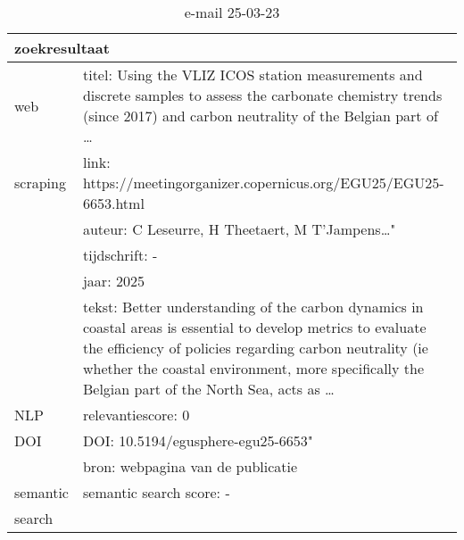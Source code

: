 \begin{table}[h!]
    \caption{e-mail 25-03-23}
    \centering
    \begin{tabularx}{\textwidth}{|p{4cm}|X|} 
        \hline
        \multicolumn{2}{|X|}{\textbf{zoekresultaat}} \\
        \hline
        web &titel: Using the VLIZ ICOS station measurements and discrete samples to assess the carbonate chemistry trends (since 2017) and carbon neutrality of the Belgian part of …\\
        scraping&link: https://meetingorganizer.copernicus.org/EGU25/EGU25-6653.html\\
        &auteur: C Leseurre, H Theetaert, M T'Jampens…"\\
        &tijdschrift: -\\
        &jaar: 2025\\
        &tekst: Better understanding of the carbon dynamics in coastal areas is essential to develop metrics to evaluate the efficiency of policies regarding carbon neutrality (ie whether the coastal environment, more specifically the Belgian part of the North Sea, acts as …\\
        \hline
        NLP&relevantiescore: 0\\
        \hline
        DOI&DOI: 10.5194/egusphere-egu25-6653"\\
        &bron: webpagina van de publicatie\\
        \hline
        semantic&semantic search score: -\\
        search&\\
        \hline
    \end{tabularx}
    \label{table:email20250323}
\end{table}
